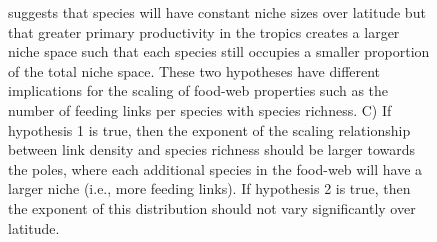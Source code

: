 \documentclass[12pt]{article}
\begin{document}
\begin{figure}[h]
{suggests that species will have constant niche sizes over latitude but that greater primary productivity 
in the tropics creates a larger niche space such that each species still occupies a smaller proportion 
of the total niche space. These two hypotheses have different implications for the scaling of food-web 
properties such as the number of feeding links per species with species richness. C) If hypothesis 1 is 
true, then the exponent of the scaling relationship between link density and species richness should 
be larger towards the poles, where each additional species in the food-web will have a larger niche 
(i.e., more feeding links). If hypothesis 2 is true, then the exponent of this distribution should 
not vary significantly over latitude.}
\label{concept}
\end{figure}
\end{document}
